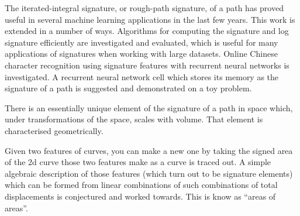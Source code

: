 \documentclass[11pt,a4paper]{report}      %
\begin{document}
\begin{thesisabstract}               %
The iterated-integral signature, or rough-path signature, of a path has proved useful in several machine learning applications in the last few years. This work is extended in a number of ways. Algorithms for computing the signature and log signature efficiently are investigated and evaluated, which is useful for many applications of signatures when working with large datasets. Online Chinese character recognition using signature features with recurrent neural networks is investigated. A recurrent neural network cell which stores its memory as the signature of a path is suggested and demonstrated on a toy problem. 

There is an essentially unique element of the signature of a path in space which, under transformations of the space, scales with volume. That element is characterised geometrically.

Given two features of curves, you can make a new one by taking the signed area of the 2d curve those two features make as a curve is traced out. A simple algebraic description of those features (which turn out to be signature elements) which can be formed from linear combinations of such combinations of total displacements is conjectured and worked towards. This is know as ``areas of areas''.
\end{thesisabstract}

\end{document}
